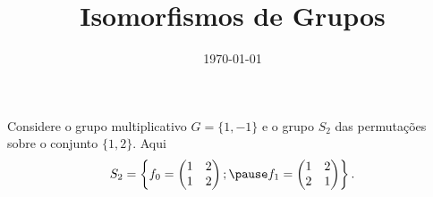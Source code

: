 \documentclass{beamer}
\title{Isomorfismos de Grupos}
\author[\autor]{\autor}
\institute[\instituto]{\instituto}
\date{\today}
\begin{document}
    \begin{frame}
        \maketitle
    \end{frame}


    \begin{frame}
        Considere o grupo multiplicativo $G = \{1, -1\}$ \pause e o grupo $S_2$ das permuta\c{c}\~oes sobre o conjunto $\{1,2\}$. \pause Aqui
        \[
            S_2 = \left\{f_0 = \begin{pmatrix}
                1 & 2\\1 & 2
            \end{pmatrix}; \pause f_1 = \begin{pmatrix}
                1 & 2\\2 & 1
            \end{pmatrix}\right\}.
        \]
    \end{frame}
\end{document}
